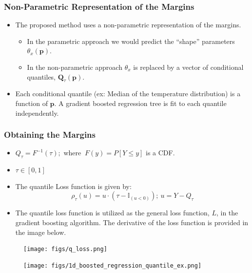 \documentclass[t, pdftex]{beamer}
\begin{document}
\begin{frame}
\frametitle{Non-Parametric Representation of the Margins}
\begin{itemize}
\item The proposed method uses a non-parametric representation of the margins.
\begin{itemize}
	\item In the parametric approach we would predict the ``shape'' parameters $\theta_{x}(\mathbf{p})$.
	\item In the non-parametric approach $\theta_x$ is replaced by a vector of conditional quantiles, $\mathbf Q_\tau (\mathbf p)$.
\end{itemize}
\item  Each conditional quantile (ex: Median of the temperature distribution) is a function of $\mathbf p$. A gradient boosted regression tree is fit to each quantile independently.
\end{itemize}
\end{frame}

\begin{frame}[shrink=25]
\frametitle{Obtaining the Margins}
\begin{itemize}
\item $Q_\tau = F^{-1}(\tau); $ where $\ F(y)=P[Y \leq y]$ is a CDF.
\item $\tau \in [0, 1]$

\item The quantile Loss function is given by:
\[
\rho_\tau(u) = u \cdot (\tau - \mathbb{I}_{(u < 0)});\ u=Y - Q_\tau
\]
\item The quantile loss function is utilized as the general loss function, $L$, in the gradient boosting algorithm.  The derivative of the loss function is provided in the image below.
\end{itemize}
\begin{figure}
        \centering
        \begin{minipage}{.5\textwidth}
            \centering
            \texttt{[image: figs/q\_loss.png]}
        \end{minipage}%
        \begin{minipage}{.5\textwidth}
            \centering
            \texttt{[image: figs/1d\_boosted\_regression\_quantile\_ex.png]}
        \end{minipage}
\end{figure}
\end{frame}
\end{document}
